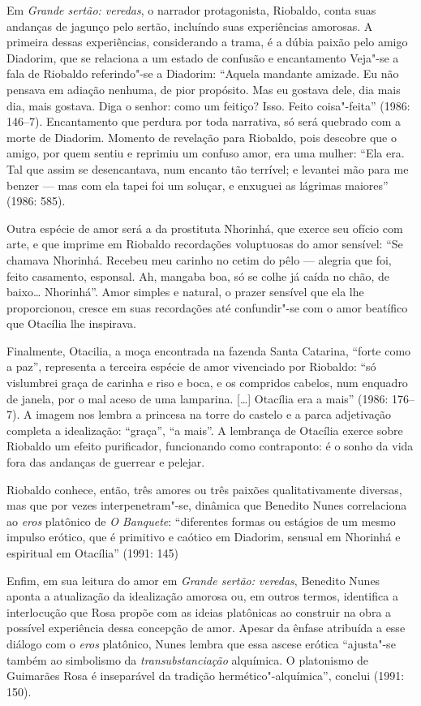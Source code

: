 {Em \emph{Grande sertão: veredas}, o narrador protagonista, Riobaldo,
conta suas andanças de jagunço pelo sertão, incluíndo suas
experiências amorosas. A primeira dessas experiências, considerando a
trama, é a dúbia paixão pelo amigo Diadorim, que se relaciona a um
estado de confusão e encantamento Veja"-se a fala de Riobaldo
referindo"-se a Diadorim: “Aquela mandante amizade. Eu não pensava em
adiação nenhuma, de pior propósito. Mas eu gostava dele, dia mais
dia, mais gostava. Diga o senhor: como um feitiço? Isso. Feito
coisa"-feita” (1986: 146--7). Encantamento que perdura por toda
narrativa, só será quebrado com a morte de Diadorim. Momento de
revelação para Riobaldo, pois descobre que o amigo, por quem sentiu e
reprimiu um confuso amor, era uma mulher: “Ela era. Tal que assim se
desencantava, num encanto tão terrível; e levantei mão para me benzer
--- mas com ela tapei foi um soluçar, e enxuguei as lágrimas maiores”
(1986: 585).

Outra espécie de amor será a da prostituta Nhorinhá, que exerce seu
ofício com arte, e que imprime em Riobaldo recordações voluptuosas do
amor sensível: “Se chamava Nhorinhá. Recebeu meu carinho no cetim do
pêlo --- alegria que foi, feito casamento, esponsal. Ah, mangaba boa,
só se colhe já caída no chão, de baixo\ldots{} Nhorinhá”. Amor simples e
natural, o prazer sensível que ela lhe proporcionou, cresce em suas
recordações até confundir"-se com o amor beatífico que Otacília lhe
inspirava.

Finalmente, Otacilia, a moça encontrada na fazenda Santa Catarina,
“forte como a paz”, representa a terceira espécie de amor vivenciado
por Riobaldo: “só vislumbrei graça de carinha e riso e boca, e os
compridos cabelos, num enquadro de janela, por o mal aceso de uma
lamparina. [\ldots{}] Otacília era a mais” (1986: 176--7). A imagem nos
lembra a princesa na torre do castelo e a parca adjetivação completa
a idealização: “graça”, “a mais”. A lembrança de Otacília exerce
sobre Riobaldo um efeito purificador, funcionando como contraponto: é
o sonho da vida fora das andanças de guerrear e pelejar.

Riobaldo conhece, então, três amores ou três paixões qualitativamente
diversas, mas que por vezes interpenetram"-se, dinâmica que Benedito
Nunes correlaciona ao \emph{eros} platônico de \emph{O Banquete}:
“diferentes formas ou estágios de um mesmo impulso erótico, que é
primitivo e caótico em Diadorim, sensual em Nhorinhá e espiritual em
Otacília” (1991: 145)

Enfim, em sua leitura do amor em \emph{Grande sertão: veredas},
Benedito Nunes aponta a atualização da idealização amorosa ou, em
outros termos, identifica a interlocução que Rosa propõe com as
ideias platônicas ao construir na obra a possível experiência dessa
concepção de amor. Apesar da ênfase atribuída a esse diálogo com o
\emph{eros} platônico, Nunes lembra que essa ascese erótica
“ajusta"-se também ao simbolismo da \emph{transubstanciação}
alquímica. O platonismo de Guimarães Rosa é inseparável da tradição
hermético"-alquímica”, conclui (1991: 150).

}
